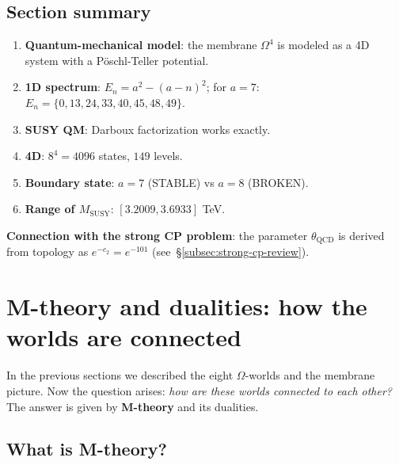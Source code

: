 \documentclass[11pt,a4paper]{article}
\newcommand{\Om}{\Omega^4}
\newcommand{\MSUSY}{M_{\text{SUSY}}}
\theoremstyle{definition}
\begin{document}
\subsection{Section summary}

\begin{enumerate}
    \item \textbf{Quantum-mechanical model}: the membrane $\Om$ 
          is modeled as a 4D system with a Pöschl-Teller potential.
    \item \textbf{1D spectrum}: $E_n = a^2 - (a-n)^2$; 
          for $a = 7$: $E_n = \{0, 13, 24, 33, 40, 45, 48, 49\}$.
    \item \textbf{SUSY QM}: Darboux factorization works exactly.
    \item \textbf{4D}: $8^4 = 4096$ states, $149$ levels.
    \item \textbf{Boundary state}: $a = 7$ (STABLE) vs 
          $a = 8$ (BROKEN).
    \item \textbf{Range of $\MSUSY$}: $[3.2009, 3.6933]$ TeV.
\end{enumerate}

\medskip\noindent
\textbf{Connection with the strong CP problem}: the parameter $\theta_{\text{QCD}}$ 
is derived from topology as $e^{-c_2} = e^{-101}$ 
(see~\S\ref{subsec:strong-cp-review}).

\section{M-theory and dualities: how the worlds are connected}
\label{sec:mtheory}

In the previous sections we described the eight $\Omega$-worlds and 
the membrane picture. Now the question arises: \emph{how are these 
worlds connected to each other?} The answer is given by \textbf{M-theory} 
and its dualities.

\subsection{What is M-theory?}
\label{subsec:what-is-mtheory}
\end{document}

